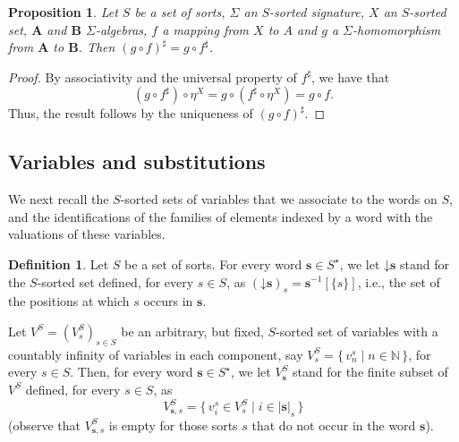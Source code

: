 \documentclass[a4paper, reqno
]{amsart}
\newcommand{\bb}[1]{\ensuremath{\lvert #1 \rvert}}
\newcommand{\vs}[1]{\mathbin{\downarrow}#1}
\theoremstyle{plain}
\newtheorem{proposition}[theorem]{Proposition}
\theoremstyle{definition}
\newtheorem{definition}[theorem]{Definition}
\begin{document}
\begin{proposition}\label{PPropUnivComp}
Let $S$ be a set of sorts, $\Sigma$ an $S$-sorted signature, $X$ an $S$-sorted set, $\mathbf{A}$ and $\mathbf{B}$ $\Sigma$-algebras, $f$ a mapping from $X$ to $A$ and $g$ a $\Sigma$-homomorphism from $\mathbf{A}$ to $\mathbf{B}$.
Then $(g \circ f)^{\sharp} = g \circ f^{\sharp}$.
\end{proposition}
\begin{proof}
By associativity and the universal property of $f^{\sharp}$, we have that
$$
(g \circ f^{\sharp}) \circ \eta^{X}
=
g \circ (f^{\sharp} \circ \eta^{X})
=
g \circ f.
$$
Thus, the result follows by the uniqueness of $(g \circ f)^{\sharp}$.
\end{proof}

\subsection{Variables and substitutions}\label{SVariables}

We next recall the $S$-sorted sets of variables that we associate to the words on $S$, and the identifications of the families of elements indexed by a word with the valuations of these variables.

\begin{definition}\label{DVariables}
Let $S$ be a set of sorts.
For every word $\mathbf{s}\in S^{\star}$, we let $\vs{\mathbf{s}}$ stand for the $S$-sorted set defined, for every $s\in S$, as $(\vs{\mathbf{s}})_{s} = \mathbf{s}^{-1}[\{s\}]$, i.e., the set of the positions at which $s$ occurs in $\mathbf{s}$.

Let $V^{S} = (V^{S}_{s})_{s\in S}$ be an arbitrary, but fixed, $S$-sorted set of variables with a countably infinity of variables in each component, say $V^{S}_{s} = \{\,v^{s}_{n}\mid n\in \mathbb{N}\,\}$, for every $s\in S$.
Then, for every word $\mathbf{s}\in S^{\star}$, we let $V^{S}_{\mathbf{s}}$ stand for the finite subset of $V^{S}$ defined, for every $s\in S$, as
$$
V^{S}_{\mathbf{s},s} = \{\,v^{s}_{i}\in V^{S}_{s}\mid i\in \bb{\mathbf{s}}_{s}\,\}
$$
(observe that $V^{S}_{\mathbf{s},s}$ is empty for those sorts $s$ that do not occur in the word $\mathbf{s}$).
\end{definition}
\end{document}
